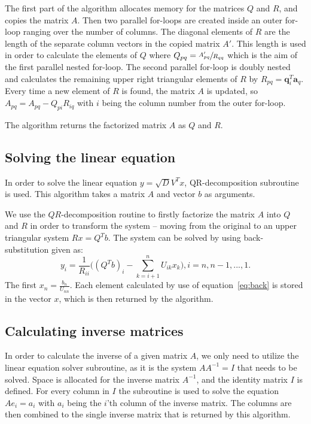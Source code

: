 \documentclass[12pt]{article}
\begin{document}
The first part of the algorithm allocates memory for the matrices $Q$ and $R$, and copies the matrix $A$. Then two parallel for-loops are created inside an outer for-loop ranging over the number of columns. The diagonal elements of $R$ are the length of the separate column vectors in the copied matrix $A'$. This length is used in order to calculate the elements of $Q$ where $Q_{pq} = \sfrac{A'_{pq}}{R_{qq}}$ which is the aim of the first parallel nested for-loop. The second parallel for-loop is doubly nested and calculates the remaining upper right triangular elements of $R$ by $R_{pq} = \mathbf{q}_{i}^T\mathbf{a}_{q}$. Every time a new element of $R$ is found, the matrix $A$ is updated, so $ A_{pq} = A_{pq} - Q_{pi}R_{iq}$ with $i$ being the column number from the outer for-loop.

The algorithm returns the factorized matrix $A$ as $Q$ and $R$.

\subsection*{Solving the linear equation}

In order to solve the linear equation $y = \sqrt{D}V^Tx$, QR-decomposition subroutine is used. This algorithm takes a matrix $A$ and vector $b$ as arguments. 

We use the $QR$-decomposition routine to firstly factorize the matrix $A$ into $Q$ and $R$ in order to transform the system -- moving from the original to an upper triangular system $Rx = Q^Tb$. The system can be solved by using back-substitution given as:
\begin{equation}
    y_i = \frac{1}{R_{ii}} \bigg((Q^Tb)_i - \sum_{k = i+1}^n U_{ik}x_k\bigg), i = n, n-1,...,1. 
    \label{eq:back}
\end{equation}
The first $x_n = \frac{b_n}{U_{nn}}$. Each element calculated by use of equation~\ref{eq:back} is stored in the vector $x$, which is then returned by the algorithm.

\subsection*{Calculating inverse matrices}

In order to calculate the inverse of a given matrix $A$, we only need to utilize the linear equation solver subroutine, as it is the system $AA^{-1}=I$ that needs to be solved. Space is allocated for the inverse matrix $A^{-1}$, and the identity matrix $I$ is defined. For every column in $I$ the subroutine is used to solve the equation $Ae_i = a_i$ with $a_i$ being the $i$'th column of the inverse matrix. The columns are then combined to the single inverse matrix that is returned by this algorithm.
\end{document}
